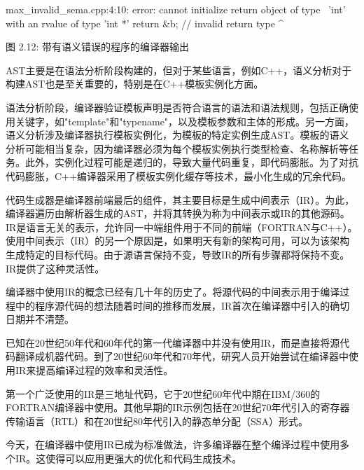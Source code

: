 \begin{shell}
max_invalid_sema.cpp:4:10: error: cannot initialize return object of type \
'int' with an rvalue of type 'int *'
  return &b; // invalid return type
         ^~
\end{shell}

\begin{center}
图 2.12: 带有语义错误的程序的编译器输出
\end{center}

AST主要是在语法分析阶段构建的，但对于某些语言，例如C++，语义分析对于构建AST也是至关重要的，特别是在C++模板实例化方面。

语法分析阶段，编译器验证模板声明是否符合语言的语法和语法规则，包括正确使用关键字，如"template"和"typename"，以及模板参数和主体的形成。另一方面，语义分析涉及编译器执行模板实例化，为模板的特定实例生成AST。模板的语义分析可能相当复杂，因为编译器必须为每个模板实例执行类型检查、名称解析等任务。此外，实例化过程可能是递归的，导致大量代码重复，即代码膨胀。为了对抗代码膨胀，C++编译器采用了模板实例化缓存等技术，最小化生成的冗余代码。


代码生成器是编译器前端最后的组件，其主要目标是生成中间表示（IR）。为此，编译器遍历由解析器生成的AST，并将其转换为称为中间表示或IR的其他源码。IR是语言无关的表示，允许同一中端组件用于不同的前端（FORTRAN与C++）。使用中间表示（IR）的另一个原因是，如果明天有新的架构可用，可以为该架构生成特定的目标代码。由于源语言保持不变，导致IR的所有步骤都将保持不变。IR提供了这种灵活性。

编译器中使用IR的概念已经有几十年的历史了。将源代码的中间表示用于编译过程中的程序源代码的想法随着时间的推移而发展，IR首次在编译器中引入的确切日期并不清楚。

已知在20世纪50年代和60年代的第一代编译器中并没有使用IR，而是直接将源代码翻译成机器代码。到了20世纪60年代和70年代，研究人员开始尝试在编译器中使用IR来提高编译过程的效率和灵活性。

第一个广泛使用的IR是三地址代码，它于20世纪60年代中期在IBM/360的FORTRAN编译器中使用。其他早期的IR示例包括在20世纪70年代引入的寄存器传输语言（RTL）和在20世纪80年代引入的静态单分配（SSA）形式。

今天，在编译器中使用IR已成为标准做法，许多编译器在整个编译过程中使用多个IR。这使得可以应用更强大的优化和代码生成技术。




































